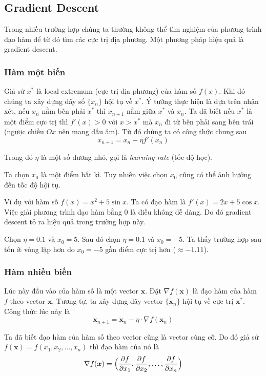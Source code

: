 \subsection*{Gradient Descent}

Trong nhiều trường hợp chúng ta thường không thể tìm nghiệm của phương trình đạo hàm để từ đó tìm các cực trị địa phương. Một phương pháp hiệu quả là gradient descent.

\subsubsection*{Hàm một biến}

Giả sử $x^*$ là local extremum (cực trị địa phương) của hàm số $f(x)$. Khi đó chúng ta xây dựng dãy số $\{ x_n \}$ hội tụ về $x^*$. Ý tưởng thực hiện là dựa trên nhận xét, nếu $x_n$ nằm bên phải $x^*$ thì $x_{n+1}$ nằm giữa $x^*$ và $x_n$. Ta đã biết nếu $x^*$ là một điểm cực trị thì $f'(x) > 0$ với $x > x^*$ mà $x_n$ đi từ bên phải sang bên trái (ngược chiều $Ox$ nên mang dấu âm). Từ đó chúng ta có công thức chung sau \[x_{n+1} = x_n - \eta f'(x_n)\]

Trong đó $\eta$ là một số dương nhỏ, gọi là \textit{learning rate} (tốc độ học).

Ta chọn $x_0$ là một điểm bất kì. Tuy nhiên việc chọn $x_0$ cũng có thể ảnh hưởng đến tốc độ hội tụ.

Ví dụ với hàm số $f(x) = x^2 + 5 \sin x$. Ta có đạo hàm là $f'(x) = 2x + 5 \cos x$. Việc giải phương trình đạo hàm bằng 0 là điều không dễ dàng. Do đó gradient descent tỏ ra hiệu quả trong trường hợp này.

Chọn $\eta = 0.1$ và $x_0 = 5$. Sau đó chọn $\eta = 0.1$ và $x_0 = -5$. Ta thấy trường hợp sau tốn ít vòng lặp hơn do $x_0 = -5$ gần điểm cực trị hơn ($\approx -1.11$).

\subsubsection*{Hàm nhiều biến}

Lúc này đầu vào của hàm số là một vector $\bm{x}$. Đặt $\nabla f(\bm{x})$ là đạo hàm của hàm $f$ theo vector $\bm{x}$. Tương tự, ta xây dựng dãy vector $\{ \bm{x}_n \}$ hội tụ về cực trị $\bm{x}^*$. Công thức lúc này là \[\bm{x}_{n+1} = \bm{x}_n - \eta \cdot \nabla f(\bm{x}_n)\]

Ta đã biết đạo hàm của hàm số theo vector cũng là vector cùng cỡ. Do đó giả sử $f(\bm{x}) = f(x_1, x_2, \ldots, x_n)$ thì đạo hàm của nó là \[\nabla f(\bm{x}) = \Bigl( \dfrac{\partial f}{\partial x_1}, \dfrac{\partial f}{\partial x_2}, \ldots, \dfrac{\partial f}{\partial x_n}\Bigr)\]

